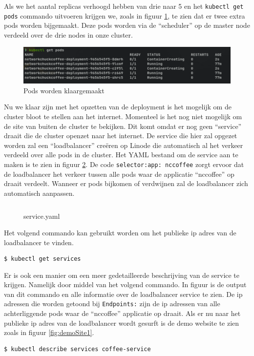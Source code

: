 Als we het aantal replicas verhoogd hebben van drie naar 5 en het \verb|kubectl get pods| commando uitvoeren krijgen we, zoals in figuur \ref{fig:kubectlGetPodsEditDeploy1}, te zien dat er twee extra pods worden bijgemaakt. Deze pods worden via de ``scheduler'' op de master node verdeeld over de drie nodes in onze cluster.
\begin{figure}[h]
	\centering
	\includegraphics[width=\linewidth]{img/kubectlGetPodsEditDeploy1.png}
	\caption{Pods worden klaargemaakt}
	\label{fig:kubectlGetPodsEditDeploy1}
\end{figure}

Nu we klaar zijn met het opzetten van de deployment is het mogelijk om de cluster bloot te stellen aan het internet. Momenteel is het nog niet mogelijk om de site van buiten de cluster te bekijken. Dit komt omdat er nog geen ``service'' draait die de cluster openzet naar het internet. De service die hier zal opgezet worden zal een ``loadbalancer'' creëren op Linode die automatisch al het verkeer verdeeld over alle pods in de cluster. Het YAML bestand om de service aan te maken is te zien in figuur \ref{service1}. De code \verb|selector:app: nccoffee| zorgt ervoor dat de loadbalancer het verkeer tussen alle pods waar de applicatie ``nccoffee'' op draait verdeelt. Wanneer er pods bijkomen of verdwijnen zal de loadbalancer zich automatisch aanpassen. 

\begin{figure}[h] 
	\inputminted[fontsize=\footnotesize,linenos]{yaml}{files/testservice.yaml}
	\caption{service.yaml}
	\label{service1}
\end{figure}



Het volgend commando kan gebruikt worden om het publieke ip adres van de loadbalancer te vinden. 
\begin{verbatim} 
$ kubectl get services
\end{verbatim}

Er is ook een manier om een meer gedetailleerde beschrijving van de service te krijgen. Namelijk door middel van het volgend commando. In figuur is de output van dit commando en alle informatie over de loadbalancer service te zien. De ip adressen die worden getoond bij \verb|Endpoints:| zijn de ip adressen van alle achterliggende pods waar de ``nccoffee'' applicatie op draait. Als er nu naar het publieke ip adres van de loadbalancer wordt gesurft is de demo website te zien zoals in figuur \ref{fig:demoSite1}.
\begin{verbatim} 
$ kubectl describe services coffee-service 
\end{verbatim}

